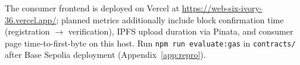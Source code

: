 The consumer frontend is deployed on Vercel at \url{https://web-six-ivory-36.vercel.app/}; planned metrics additionally include block confirmation time (registration $\rightarrow$ verification), IPFS upload duration via Pinata, and consumer page time-to-first-byte on this host.
Run \texttt{npm run evaluate:gas} in \texttt{contracts/} after Base Sepolia deployment (Appendix~\ref{app:repro}).
